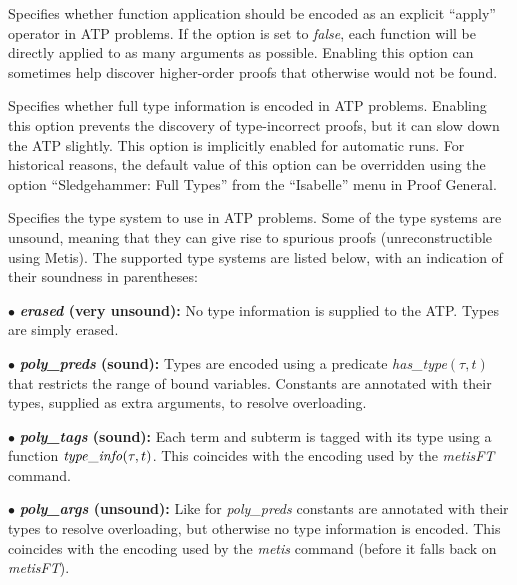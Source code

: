 \documentclass[a4paper,12pt]{article}
\begin{document}
\begin{enum}
Specifies whether function application should be encoded as an explicit
``apply'' operator in ATP problems. If the option is set to \textit{false}, each
function will be directly applied to as many arguments as possible. Enabling
this option can sometimes help discover higher-order proofs that otherwise would
not be found.

Specifies whether full type information is encoded in ATP problems. Enabling
this option prevents the discovery of type-incorrect proofs, but it can slow
down the ATP slightly. This option is implicitly enabled for automatic runs. For
historical reasons, the default value of this option can be overridden using the
option ``Sledgehammer: Full Types'' from the ``Isabelle'' menu in Proof General.

Specifies the type system to use in ATP problems. Some of the type systems are
unsound, meaning that they can give rise to spurious proofs (unreconstructible
using Metis). The supported type systems are listed below, with an indication of
their soundness in parentheses:

\begin{enum}
\item[$\bullet$] \textbf{\textit{erased} (very unsound):} No type information is
supplied to the ATP. Types are simply erased.

\item[$\bullet$] \textbf{\textit{poly\_preds} (sound):} Types are encoded using
a predicate \textit{has\_\allowbreak type\/}$(\tau, t)$ that restricts the range
of bound variables. Constants are annotated with their types, supplied as extra
arguments, to resolve overloading.

\item[$\bullet$] \textbf{\textit{poly\_tags} (sound):} Each term and subterm is
tagged with its type using a function $\mathit{type\_info\/}(\tau, t)$. This
coincides with the encoding used by the \textit{metisFT} command.

\item[$\bullet$] \textbf{\textit{poly\_args} (unsound):}
Like for \textit{poly\_preds} constants are annotated with their types to
resolve overloading, but otherwise no type information is encoded. This
coincides with the encoding used by the \textit{metis} command (before it falls
back on \textit{metisFT}).


\end{enum}
\end{enum}
\end{document}
